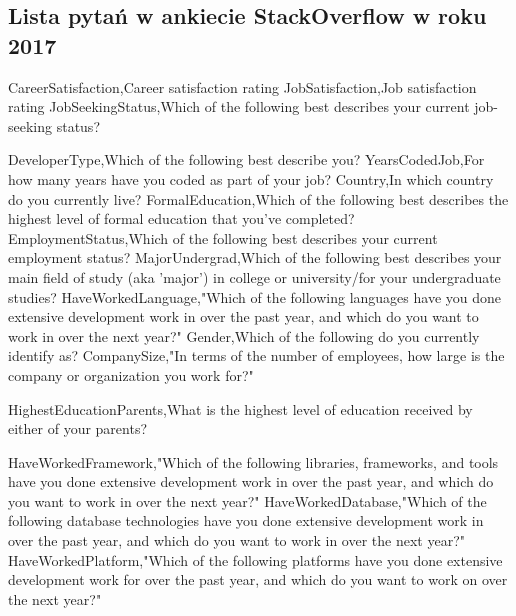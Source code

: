 
\appendix
\begin{appendices}
    \chapter{Lista pytań w ankiecie StackOverflow w roku 2017}\label{app:dod1}

CareerSatisfaction,Career satisfaction rating
JobSatisfaction,Job satisfaction rating
JobSeekingStatus,Which of the following best describes your current job-seeking status?


DeveloperType,Which of the following best describe you?
YearsCodedJob,For how many years have you coded as part of your job?
Country,In which country do you currently live?
FormalEducation,Which of the following best describes the highest level of formal education that you've completed?
EmploymentStatus,Which of the following best describes your current employment status?
MajorUndergrad,Which of the following best describes your main field of study (aka 'major') in college or university/for your undergraduate studies?
HaveWorkedLanguage,"Which of the following languages have you done extensive development work in over the past year, and which do you want to work in over the next year?"
Gender,Which of the following do you currently identify as?
CompanySize,"In terms of the number of employees, how large is the company or organization you work for?"

HighestEducationParents,What is the highest level of education received by either of your parents?

HaveWorkedFramework,"Which of the following libraries, frameworks, and tools have you done extensive development work in over the past year, and which do you want to work in over the next year?"
HaveWorkedDatabase,"Which of the following database technologies have you done extensive development work in over the past year, and which do you want to work in over the next year?"
HaveWorkedPlatform,"Which of the following platforms have you done extensive development work for over the past year, and which do you want to work on over the next year?"



\end{appendices}
